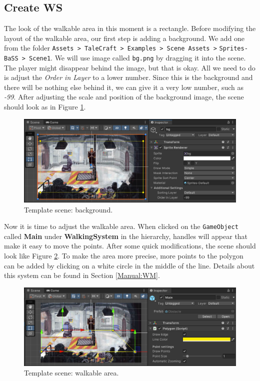 \subsection{Create WS}
The look of the walkable area in this moment is a rectangle. Before modifying the layout of the walkable area, our first step is adding a background. We add one from the folder \verb|Assets > TaleCraft > Examples > Scene Assets >| \verb|Sprites-BaSS > Scene1|. We will use image called \verb|bg.png| by dragging it into the scene. The player might disappear behind the image, but that is okay. All we need to do is adjust the \textit{Order in Layer} to a lower number. Since this is the background and there will be nothing else behind it, we can give it a very low number, such as \textit{-99}. After adjusting the scale and position of the background image, the scene should look as in Figure \ref{fig:Tutorial-template:bg}.
\begin{figure}[H]
\centering
\includegraphics[width=1\linewidth]{img/User doc/image_2025-07-08_104224540.png}
\caption{Template scene: background.}
\label{fig:Tutorial-template:bg}
\end{figure}

Now it is time to adjust the walkable area. When clicked on the \verb|GameObject| called \textbf{Main} under \textbf{WalkingSystem} in the hierarchy, handles will appear that make it easy to move the points. After some quick modifications, the scene should look like Figure \ref{fig:Tutorial-template:main}. To make the area more precise, more points to the polygon can be added by clicking on a white circle in the middle of the line. Details about this system can be found in Section \ref{Manual:WM}.

\begin{figure}[H]
\centering
\includegraphics[width=1\linewidth]{img/User doc/image_2025-07-08_104843701.png}
\caption{Template scene: walkable area.}
\label{fig:Tutorial-template:main}
\end{figure}

